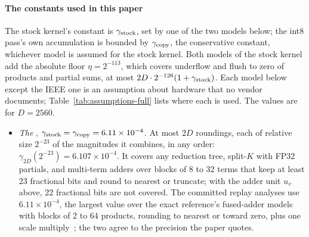 \paragraph{The constants used in this paper} The stock kernel's constant is $\gamma_{\rm stock}$, set by one of the two models below; the int8 pass's own accumulation is bounded by $\gamma_{\rm copy}$, the conservative constant, whichever model is assumed for the stock kernel. Both models of the stock kernel add the absolute floor $\eta=2^{-113}$, which covers underflow and flush to zero of products and partial sums, at most $2D\cdot2^{-126}(1+\gamma_{\rm stock})$. Each model below except the IEEE one is an assumption about hardware that no vendor documents; Table~\ref{tab:assumptions-full} lists where each is used. The values are for $D=2560$.
\begin{itemize}
\item \emph{The \modelcons{}}, $\gamma_{\rm stock}=\gamma_{\rm copy}=6.11\times10^{-4}$. At most $2D$ roundings, each of relative size $2^{-23}$ of the magnitudes it combines, in any order: $\gamma_{2D}(2^{-23})=6.107\times10^{-4}$. It covers any reduction tree, split-$K$ with FP32 partials, and multi-term adders over blocks of 8 to 32 terms that keep at least 23 fractional bits and round to nearest or truncate; with the adder unit $u_v$ above, 22 fractional bits are not covered. The committed replay analyses use $6.11\times10^{-4}$, the largest value over the exact reference's fused-adder models with blocks of 2 to 64 products, rounding to nearest or toward zero, plus one scale multiply~; the two agree to the precision the paper quotes.

\end{itemize}
